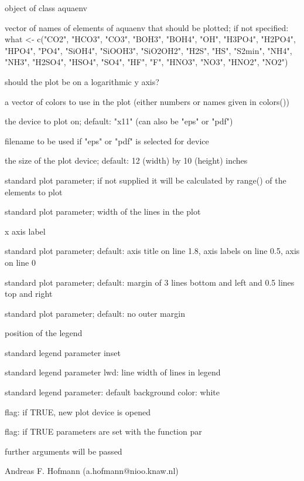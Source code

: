 \documentclass{article}
\begin{document}
\begin{Arguments}
\begin{ldescription}
\item[\code{aquaenv }] object of class aquaenv
\item[\code{what }] vector of names of elements of aquaenv that should be plotted; if not specified:  what <- c("CO2", "HCO3", "CO3", "BOH3", "BOH4", "OH", "H3PO4", "H2PO4", "HPO4", "PO4", "SiOH4", "SiOOH3", "SiO2OH2", "H2S", "HS", "S2min", "NH4", "NH3", "H2SO4", "HSO4", "SO4", "HF", "F", "HNO3", "NO3", "HNO2", "NO2")
\item[\code{log }] should the plot be on a logarithmic y axis?
\item[\code{palette }] a vector of colors to use in the plot (either numbers or names given in colors())
\item[\code{device }] the device to plot on; default: "x11" (can also be "eps" or "pdf")
\item[\code{filename }] filename to be used if "eps" or "pdf" is selected for device
\item[\code{size }] the size of the plot device; default: 12 (width) by 10 (height) inches
\item[\code{ylim }] standard plot parameter; if not supplied it will be calculated by range() of the elements to plot
\item[\code{lwd }] standard plot parameter; width of the lines in the plot
\item[\code{xlab }] x axis label
\item[\code{mgp }] standard plot parameter; default: axis title on line 1.8, axis labels on line 0.5, axis on line 0
\item[\code{mar }] standard plot parameter; default: margin of 3 lines bottom and left and 0.5 lines top and right
\item[\code{oma }] standard plot parameter; default: no outer margin
\item[\code{legendposition }] position of the legend
\item[\code{legendinset }] standard legend parameter inset
\item[\code{legendlwd }] standard legend parameter lwd: line width of lines in legend
\item[\code{bg }] standard legend parameter: default background color: white
\item[\code{newdevice}] flag: if TRUE, new plot device is opened
\item[\code{setpar}] flag: if TRUE parameters are set with the function par
\item[\code{... }] further arguments will be passed
\end{ldescription}
\end{Arguments}
\begin{Author}\relax
Andreas F. Hofmann (a.hofmann@nioo.knaw.nl)
\end{Author}
\end{document}
